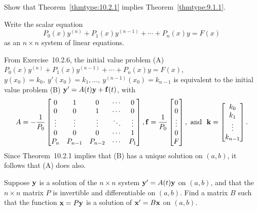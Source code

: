 \documentclass{ximera}
\begin{document}
\begin{problem}\label{exer:10.2.12} Show that Theorem~\ref{thmtype:10.2.1} implies
Theorem~\ref{thmtype:9.1.1}.  
\begin{hint}Write the scalar equation
$$
P_0(x)y^{(n)}+P_1(x)y^{(n-1)}+\cdots+P_n(x)y=F(x)
$$
as an $n\times n$ system of linear equations.
\end{hint}

\begin{solution}
    From Exercise~10.2.6, the initial value problem
(A) $P_0(x)y^{(n)}+P_1(x)y^{(n-1)}+\cdots+P_n(x)y=F(x)$,
$y(x_0)=k_0,\ y'(x_0)=k_1,\dots,\ y^{(n-1)}(x_0)=k_{n-1}$ is
equivalent to the initial value problem (B) ${\bf y'}=A(t){\bf y}+{\bf
f}(t)$, with
$$A=-\frac{1}{ P_0}
\begin{bmatrix}
0&1&0&\cdots&0\\
0&0&1&\cdots&0\\
\vdots&\vdots&\vdots&\ddots&\vdots\\
0&0&0&\cdots&1\\
P_n&P_{n-1}&P_{n-2}&\cdots&P_1
\end{bmatrix},
{\bf f}=\frac{1}{ P_0}
\begin{bmatrix}
0\\ 0\\\vdots\\0\\F
\end{bmatrix},
\mbox{\ and \ }
{\bf k}=
\begin{bmatrix}
k_0\\k_1\\\vdots\\k_{n-1}
\end{bmatrix}.
$$
Since Theorem~10.2.1 implies that (B) has a unique solution on
$(a,b)$, it follows that (A) does also.
\end{solution}
\end{problem}

\begin{problem}\label{exer:10.2.13}
Suppose ${\bf y}$ is a solution of the $n\times n$ system  ${\bf
y}'=A(t){\bf y}$ on $(a,b)$, and that the $n\times n$ matrix $P$
is invertible and differentiable on $(a,b)$. Find a matrix $B$
such that the function ${\bf x}=P{\bf y}$ is a solution of ${\bf x}'=B{\bf
x}$ on $(a,b)$.
\end{problem}
\end{document}
